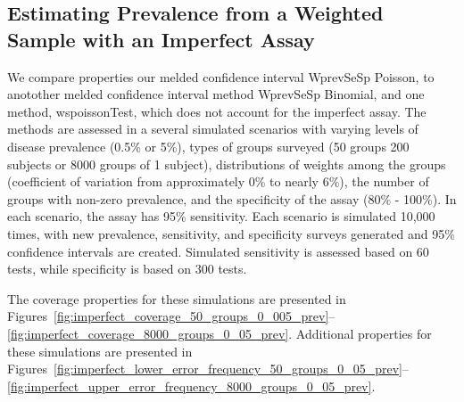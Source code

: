 \documentclass[AMA,STIX1COL]{WileyNJD-v2}
\begin{document}
\subsection{Estimating Prevalence from a Weighted Sample with an Imperfect Assay}


We compare properties our melded confidence interval WprevSeSp Poisson, to anotother melded confidence interval method WprevSeSp Binomial, and one method, wspoissonTest, which does not account for the imperfect assay.
The methods are assessed in a several simulated scenarios with varying levels of disease prevalence (0.5\% or 5\%), types of groups surveyed (50 groups 200 subjects or 8000 groups of 1 subject), distributions of weights among the groups (coefficient of variation from approximately 0\% to nearly 6\%), the number of groups with non-zero prevalence, and the specificity of the assay (80\% - 100\%).
In each scenario, the assay has 95\% sensitivity.
Each scenario is simulated 10,000 times, with new prevalence, sensitivity, and specificity surveys generated and 95\% confidence intervals are created.
Simulated sensitivity is assessed based on 60 tests, while specificity is based on 300 tests.


The coverage properties for these simulations are presented in Figures~\ref{fig:imperfect_coverage_50_groups_0_005_prev}--\ref{fig:imperfect_coverage_8000_groups_0_05_prev}.
Additional properties for these simulations are presented in Figures~\ref{fig:imperfect_lower_error_frequency_50_groups_0_05_prev}--\ref{fig:imperfect_upper_error_frequency_8000_groups_0_05_prev}.
\end{document}
